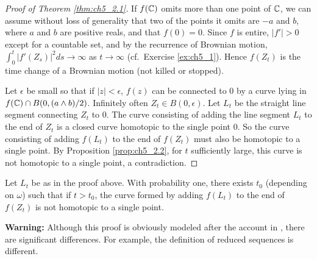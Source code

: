 \begin{proof}[Proof of Theorem \ref{thm:ch5_2.1}]
If $f(\mathbb{C})$ omits more than one point of $\mathbb{C}$, we can assume without loss of generality that two of the points it omits are $-a$ and $b$, where $a$ and $b$ are positive reals, and that $f(0) = 0$. Since $f$ is entire, $|f'| > 0$ except for a countable set, and by the recurrence of Brownian motion, $\int_0^t |f'(Z_s)|^2ds \to \infty$ as $t \to \infty$ (cf.\ Exercise \ref{ex:ch5_1}). Hence $f(Z_t)$ is the time change of a Brownian motion (not killed or stopped).

Let $\epsilon$ be small so that if $|z| < \epsilon$, $f(z)$ can be connected to $0$ by a curve lying in $f(\mathbb{C}) \cap B(0,(a \wedge b)/2)$. Infinitely often $Z_t \in B(0,\epsilon)$. Let $L_t$ be the straight line segment connecting $Z_t$ to $0$. The curve consisting of adding the line segment $L_t$ to the end of $Z_t$ is a closed curve homotopic to the single point $0$. So the curve consisting of adding $f(L_t)$ to the end of $f(Z_t)$ must also be homotopic to a single point. By Proposition \ref{prop:ch5_2.2}, for $t$ sufficiently large, this curve is not homotopic to a single point, a contradiction.
\end{proof}

\begin{proposition}\label{prop:ch5_2.2}
Let $L_t$ be as in the proof above. With probability one, there exists $t_0$ (depending on $\omega$) such that if $t > t_0$, the curve formed by adding $f(L_t)$ to the end of $f(Z_t)$ is not homotopic to a single point.
\end{proposition}


\textbf{Warning:} Although this proof is obviously modeled after the account in \cite{Durrett1984}, there are significant differences. For example, the definition of reduced sequences is different.

